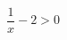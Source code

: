 \documentclass[preview]{standalone}
\begin{document}
\begin{align*}
\dfrac{1}{x} - 2 > 0
\end{align*}
\end{document}
